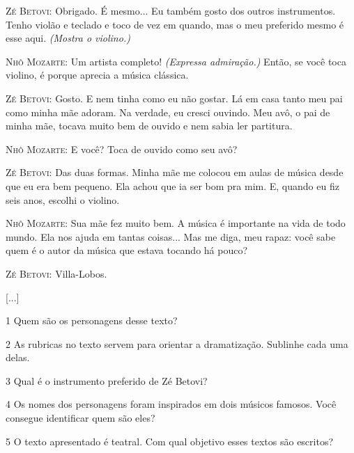 \begin{myquote}
\textsc{Zé Betovi}: Obrigado. É mesmo... Eu também gosto dos outros
instrumentos. Tenho violão e teclado e toco de vez em quando, mas o meu
preferido mesmo é esse aqui. \textit{(Mostra o violino.)}

\textsc{Nhô Mozarte}: Um artista completo! \textit{(Expressa admiração.)} Então, se
você toca violino, é porque aprecia a música clássica.

\textsc{Zé Betovi}: Gosto. E nem tinha como eu não gostar. Lá em casa
tanto meu pai como minha mãe adoram. Na verdade, eu cresci ouvindo. Meu
avô, o pai de minha mãe, tocava muito bem de ouvido e nem sabia ler
partitura.

\textsc{Nhô Mozarte}: E você? Toca de ouvido como seu avô?

\textsc{Zé Betovi}: Das duas formas. Minha mãe me colocou em aulas de
música desde que eu era bem pequeno. Ela achou que ia ser bom pra mim.
E, quando eu fiz seis anos, escolhi o violino.

\textsc{Nhô Mozarte}: Sua mãe fez muito bem. A música é importante na vida
de todo mundo. Ela nos ajuda em tantas coisas... Mas me diga, meu rapaz:
você sabe quem é o autor da música que estava tocando há pouco?

\textsc{Zé Betovi}: Villa-Lobos.

{[}...{]}

\end{myquote}

\pagebreak
\num{1} Quem são os personagens desse texto? 


\num{2} As rubricas no texto servem para orientar a dramatização. Sublinhe cada uma delas.
\bigskip

\num{3} Qual é o instrumento preferido de Zé Betovi? 


\num{4} Os nomes dos personagens foram inspirados em dois músicos famosos. Você
consegue identificar quem são eles? 


\num{5} O texto apresentado é teatral. Com qual objetivo esses textos são
escritos? 



